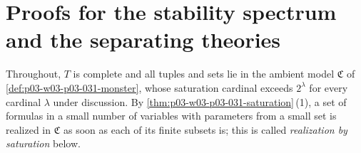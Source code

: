 \section{Proofs for the stability spectrum and the separating theories}
\label{sec:annex-p03-w03-p03-032-spectrum}

Throughout, \(T\) is complete and all tuples and sets lie in the ambient
model \(\mathfrak C\) of \cref{def:p03-w03-p03-031-monster}, whose saturation
cardinal exceeds \(2^\lambda\) for every cardinal \(\lambda\) under
discussion.  By \cref{thm:p03-w03-p03-031-saturation}\,(1), a set of
formulas in a small number of variables with parameters from a small set is
realized in \(\mathfrak C\) as soon as each of its finite subsets is; this is
called \emph{realization by saturation} below.

